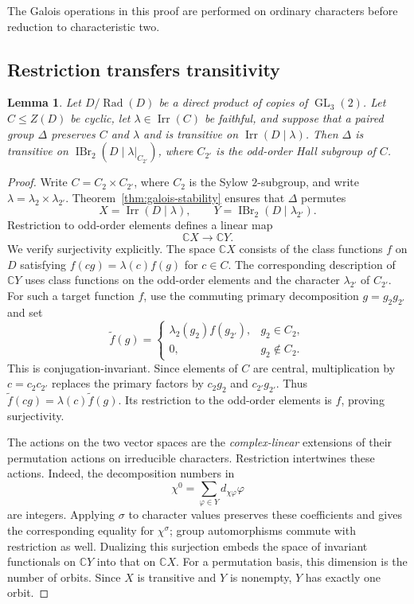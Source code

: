 \documentclass[11pt,a4paper]{amsart}
\DeclareMathOperator{\Irr}{Irr}
\DeclareMathOperator{\IBr}{IBr}
\DeclareMathOperator{\Rad}{Rad}
\DeclareMathOperator{\GL}{GL}
\newtheorem{lemma}[theorem]{Lemma}
\theoremstyle{remark}
\numberwithin{equation}{section}
\begin{document}
The Galois operations in this proof are performed on ordinary characters
before reduction to characteristic two.

\subsection*{Restriction transfers transitivity}

\begin{lemma}\label{lemma:restriction-transitivity}
Let $D/\Rad(D)$ be a direct product of copies of $\GL_3(2)$.
Let $C\leq Z(D)$ be cyclic, let $\lambda\in\Irr(C)$ be faithful,
and suppose that a paired group $\Delta$ preserves $C$ and $\lambda$
and is transitive on $\Irr(D\mid\lambda)$. Then $\Delta$ is transitive on
$\IBr_2(D\mid\lambda|_{C_{2'}})$, where $C_{2'}$ is the odd-order
Hall subgroup of $C$.
\end{lemma}

\begin{proof}
Write $C=C_2\times C_{2'}$, where $C_2$ is the Sylow $2$-subgroup,
and write $\lambda=\lambda_2\times\lambda_{2'}$.
Theorem~\ref{thm:galois-stability} ensures that $\Delta$ permutes
\[
 X=\Irr(D\mid\lambda),\qquad
 Y=\IBr_2(D\mid\lambda_{2'}).
\]
Restriction to odd-order elements defines a linear map
\[
 \mathbb C X\longrightarrow\mathbb C Y.
\]
We verify surjectivity explicitly. The space $\mathbb C X$ consists
of the class functions $f$ on $D$ satisfying
$f(cg)=\lambda(c)f(g)$ for $c\in C$. The corresponding description
of $\mathbb C Y$ uses class functions on the odd-order elements
and the character $\lambda_{2'}$ of $C_{2'}$.
For such a target function $f$, use the commuting primary
decomposition $g=g_2g_{2'}$ and set
\[
 \widetilde f(g)=
 \begin{cases}
  \lambda_2(g_2)f(g_{2'}),&g_2\in C_2,\\
  0,&g_2\notin C_2.
 \end{cases}
\]
This is conjugation-invariant. Since elements of $C$ are central,
multiplication by $c=c_2c_{2'}$ replaces the primary factors by
$c_2g_2$ and $c_{2'}g_{2'}$. Thus
$\widetilde f(cg)=\lambda(c)\widetilde f(g)$.
Its restriction to the odd-order elements is $f$, proving
surjectivity.

The actions on the two vector spaces are the \emph{complex-linear}
extensions of their permutation actions on irreducible characters.
Restriction intertwines these actions. Indeed, the decomposition
numbers in
\[
 \chi^0=\sum_{\varphi\in Y}d_{\chi\varphi}\varphi
\]
are integers. Applying $\sigma$ to character values preserves
these coefficients and gives the corresponding equality for
$\chi^\sigma$; group automorphisms commute with restriction as
well. Dualizing this surjection embeds the space of invariant
functionals on $\mathbb C Y$ into that on $\mathbb C X$.
For a permutation basis, this dimension is the number of orbits.
Since $X$ is transitive and $Y$ is nonempty, $Y$ has exactly one orbit.
\end{proof}
\end{document}
